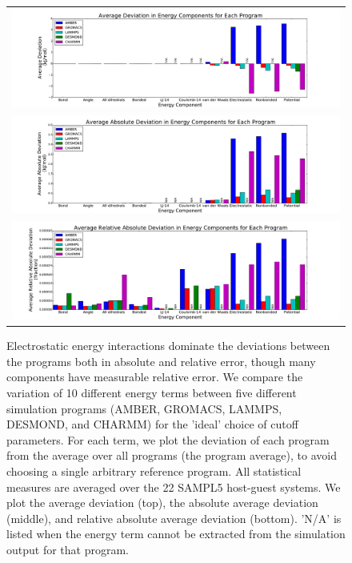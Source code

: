\begin{figure}[h]
\begin{tabular}{c}
\includegraphics[width=\textwidth]{AverageIdealSettings.pdf} \\  
\includegraphics[width=\textwidth]{AverageAbsoluteIdealSettings.pdf} \\  
\includegraphics[width=\textwidth]{AverageRelativeAbsoluteIdealSettings.pdf}
\end{tabular}
\caption{Electrostatic energy interactions dominate the deviations
  between the programs both in absolute and relative error, though
  many components have measurable relative error. We compare the
  variation of 10 different energy terms between five different
  simulation programs (AMBER, GROMACS, LAMMPS, DESMOND, and CHARMM)
  for the 'ideal' choice of cutoff parameters. For each term, we plot
  the deviation of each program from the average over all programs
  (the program average), to avoid choosing a single arbitrary
  reference program. All statistical measures are averaged over the 22 SAMPL5
  host-guest systems. We plot the average deviation (top), the
  absolute average deviation (middle), and relative absolute average
  deviation (bottom). 'N/A' is listed when the energy term cannot be extracted 
  from the simulation output for that program.
\label{fig:mainfig}}
\end{figure}

